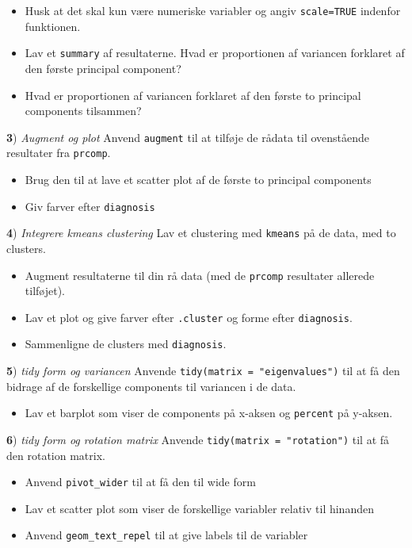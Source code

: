 \documentclass[
]{book}
\providecommand{\tightlist}{%
  \setlength{\itemsep}{0pt}\setlength{\parskip}{0pt}}
\begin{document}
\begin{itemize}
\tightlist
\item
  Husk at det skal kun være numeriske variabler og angiv \texttt{scale=TRUE} indenfor funktionen.
\item
  Lav et \texttt{summary} af resultaterne. Hvad er proportionen af variancen forklaret af den første principal component?
\item
  Hvad er proportionen af variancen forklaret af den første to principal components tilsammen?
\end{itemize}

\textbf{3}) \emph{Augment og plot} Anvend \texttt{augment} til at tilføje de rådata til ovenstående resultater fra \texttt{prcomp}.

\begin{itemize}
\tightlist
\item
  Brug den til at lave et scatter plot af de første to principal components
\item
  Giv farver efter \texttt{diagnosis}
\end{itemize}

\textbf{4}) \emph{Integrere kmeans clustering} Lav et clustering med \texttt{kmeans} på de data, med to clusters.

\begin{itemize}
\tightlist
\item
  Augment resultaterne til din rå data (med de \texttt{prcomp} resultater allerede tilføjet).
\item
  Lav et plot og give farver efter \texttt{.cluster} og forme efter \texttt{diagnosis}.
\item
  Sammenligne de clusters med \texttt{diagnosis}.
\end{itemize}

\textbf{5}) \emph{tidy form og variancen} Anvende \texttt{tidy(matrix\ =\ "eigenvalues")} til at få den bidrage af de forskellige components til variancen i de data.

\begin{itemize}
\tightlist
\item
  Lav et barplot som viser de components på x-aksen og \texttt{percent} på y-aksen.
\end{itemize}

\textbf{6}) \emph{tidy form og rotation matrix} Anvende \texttt{tidy(matrix\ =\ "rotation")} til at få den rotation matrix.

\begin{itemize}
\tightlist
\item
  Anvend \texttt{pivot\_wider} til at få den til wide form
\item
  Lav et scatter plot som viser de forskellige variabler relativ til hinanden
\item
  Anvend \texttt{geom\_text\_repel} til at give labels til de variabler
\end{itemize}
\end{document}
